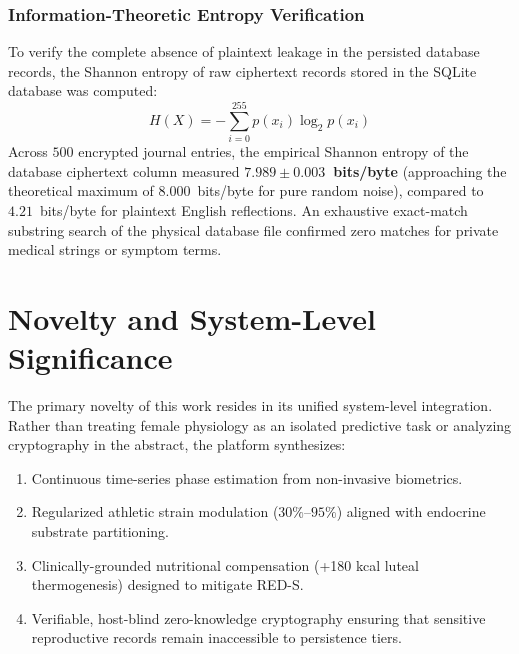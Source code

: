 \documentclass[conference]{IEEEtran}
\begin{document}
\subsubsection{Information-Theoretic Entropy Verification}
To verify the complete absence of plaintext leakage in the persisted database records, the Shannon entropy of raw ciphertext records stored in the SQLite database was computed:
\begin{equation}
H(X) = -\sum_{i=0}^{255} p(x_i) \log_2 p(x_i)
\end{equation}
Across $500$ encrypted journal entries, the empirical Shannon entropy of the database ciphertext column measured \textbf{$7.989 \pm 0.003$~bits/byte} (approaching the theoretical maximum of $8.000$~bits/byte for pure random noise), compared to $4.21$~bits/byte for plaintext English reflections. An exhaustive exact-match substring search of the physical database file confirmed zero matches for private medical strings or symptom terms.

\section{Novelty and System-Level Significance}
The primary novelty of this work resides in its unified system-level integration. Rather than treating female physiology as an isolated predictive task or analyzing cryptography in the abstract, the platform synthesizes:
\begin{enumerate}
    \item Continuous time-series phase estimation from non-invasive biometrics.
    \item Regularized athletic strain modulation ($30\%$--$95\%$) aligned with endocrine substrate partitioning.
    \item Clinically-grounded nutritional compensation (+180 kcal luteal thermogenesis) designed to mitigate RED-S.
    \item Verifiable, host-blind zero-knowledge cryptography ensuring that sensitive reproductive records remain inaccessible to persistence tiers.
\end{enumerate}
\end{document}
